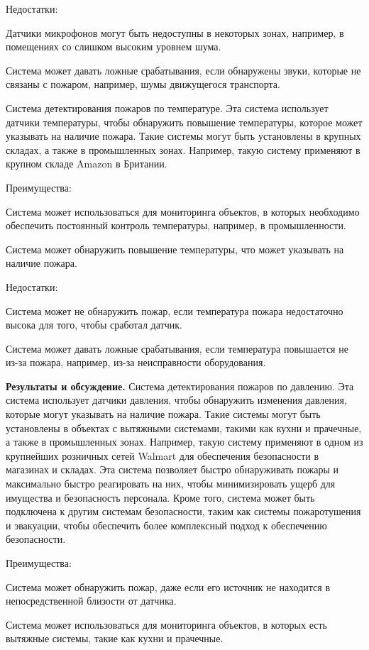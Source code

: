 \begin{multicols}{2}
Недостатки:

Датчики микрофонов могут быть недоступны в некоторых зонах, например,
в помещениях со слишком высоким уровнем шума.

Система может давать ложные срабатывания, если обнаружены звуки,
которые не связаны с пожаром, например, шумы движущегося транспорта.

Система детектирования пожаров по температуре. Эта система использует
датчики температуры, чтобы обнаружить повышение температуры, которое
может указывать на наличие пожара. Такие системы могут быть установлены
в крупных складах, а также в промышленных зонах. Например, такую систему
применяют в крупном складе Amazon в Британии.

Преимущества:

Система может использоваться для мониторинга объектов, в которых
необходимо обеспечить постоянный контроль температуры, например, в
промышленности.

Система может обнаружить повышение температуры, что может указывать на
наличие пожара.

Недостатки:

Система может не обнаружить пожар, если температура пожара
недостаточно высока для того, чтобы сработал датчик.

Система может давать ложные срабатывания, если температура повышается
не из-за пожара, например, из-за неисправности оборудования.

{\bfseries Результаты и обсуждение.} Система детектирования пожаров по
давлению. Эта система использует датчики давления, чтобы обнаружить
изменения давления, которые могут указывать на наличие пожара. Такие
системы могут быть установлены в объектах с вытяжными системами, такими
как кухни и прачечные, а также в промышленных зонах. Например, такую
систему применяют в одном из крупнейших розничных сетей Walmart для
обеспечения безопасности в магазинах и складах. Эта система позволяет
быстро обнаруживать пожары и максимально быстро реагировать на них,
чтобы минимизировать ущерб для имущества и безопасность персонала. Кроме
того, система может быть подключена к другим системам безопасности,
таким как системы пожаротушения и эвакуации, чтобы обеспечить более
комплексный подход к обеспечению безопасности.

Преимущества:

Система может обнаружить пожар, даже если его источник не находится в
непосредственной близости от датчика.

Система может использоваться для мониторинга объектов, в которых есть
вытяжные системы, такие как кухни и прачечные.


\end{multicols}
